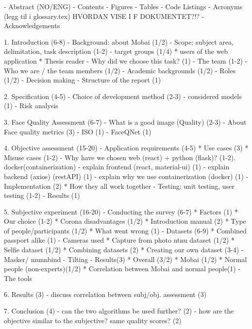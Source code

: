 - Abstract (NO/ENG)
- Contents
- Figures
- Tables
- Code Listings
- Acronyms (legg til i glossary.tex) HVORDAN VISE I F DOKUMENTET?!?
- Acknowledgements

1. Introduction (6-8)
 - Background: about Mobai (1/2)
 - Scope: subject area, delimitation, task description (1-2)
 - target groups (1/4)
    * users of the web application
    * Thesis reader
 - Why did we choose this task? (1)
 - The team (1-2)
   - Who we are / the team members (1/2)
   - Academic backgrounds (1/2)
   - Roles (1/2)
   - Decision making
 - Structure of the report (1)
 
 2. Specification (4-5)
    - Choice of development method (2-3) 
        - considered models (1)
    - Risk analysis
    
    
3. Face Quality Assessment (6-7)
    - What is a good image (Quality) (2-3)
    - About Face quality metrics (3)
        - ISO (1)
        - FaceQNet (1)
  
  
4. Objective assessment (15-20)
    - Application requirements (4-5)
        * Use cases (3)
        * Misuse cases (1-2)
    - Why have we chosen web (react) + python (flask)? (1-2). docker(containerization) 
    - explain frontend (react, material-ui) (1)
    - explain backend (axios) (restAPI) (1)
    - explain why we use containerization (docker) (1)
    - Implementation (2)
        * How they all work together
    - Testing: unit testing, user testing (1-2)
    - Results (1)
    

5. Subjective experiment (16-20)
   - Conducting the survey  (6-7)
        * Factors (1) 
        * Our choice (1-2) 
        * Corona disadvantages (1/2)
        * Introduction manual (2) 
        * Type of people/participants (1/2)
        * What went wrong (1)
    - Datasets (6-9)
        * Combined passport alike (1)
            - Cameras used
        * Capture from photo ntnu dataset (1/2)
        * Selfie dataset (1/2)
        * Combining datasets (2)
        * Creating our own dataset (3-4)
            - Masker/ munnbind 
            - Tilting 
    - Results(3) 
        * Overall (3/2)
        * Mobai (1/2)
        * Normal people (non-experts)(1/2)
        * Correlation between Mobai and normal people(1)
            - The tools
 
6. Results (3)
     - discuss correlation between subj/obj. assessment (3)
  
7. Conclusion (4)
    - can the two algorithms be used further? (2)
    - how are the objective similar to the subjective? same quality scores? (2)
  
